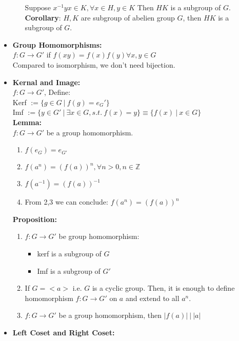 \documentclass[12pt]{article}
\begin{document}
\begin{itemize}
\begin{enumerate}
            Suppose $x^{-1}yx\in K, \forall x\in H, y \in K$ Then $HK$ is a subgroup of $G$.\\
            \textbf{Corollary}: $H,K$ are subgroup of abelien group $G$, then $HK$ is a subgroup of $G$.
        \end{enumerate}
        \item \textbf{Group Homomorphisms:}\\
        $f: G \rightarrow G'$ if $f(xy) = f(x)f(y) \forall x,y \in G$\\
        Compared to isomorphism, we don't need bijection.
        \item \textbf{Kernal and Image:}\\
        $f: G \rightarrow G'$, Define:\\
        Kerf $:=\{g \in G \ | \ f(g) = e_G'\}$\\
        Imf $:= \{y \in G' \ | \ \exists x \in G, s.t. \ f(x) = y\} \equiv \{f(x) \ | \ x\in G\}$\\
        \textbf{Lemma:}\\
        $f: G \rightarrow G'$ be a group homomorphism.
        \begin{enumerate}
            \item $f(e_G) = e_{G'}$
            \item $f(a^n) = (f(a))^n, \forall n >0, n \in \mathbb{Z}$
            \item $f(a^{-1}) = (f(a))^{-1}$
            \item From 2,3 we can conclude: $f(a^n) = (f(a))^n$
        \end{enumerate}
        \textbf{Proposition:}
        \begin{enumerate}
            \item $f: G \rightarrow G'$ be group homomorphism:
            \begin{itemize}
                \item kerf is a subgroup of $G$
                \item Imf is a subgroup of $G'$
            \end{itemize}
            \item If $G = <a>$ i.e. $G$ is a cyclic group. Then, it is enough to define homomorphism $f:G\rightarrow G'$ on $a$ and extend to all $a^n$.
            \item $f: G\rightarrow G'$ be a group homomorphism, then $|f(a)| \ | \ |a|$
        \end{enumerate}
        \item \textbf{Left Coset and Right Coset:}\\

\end{itemize}
\end{document}
